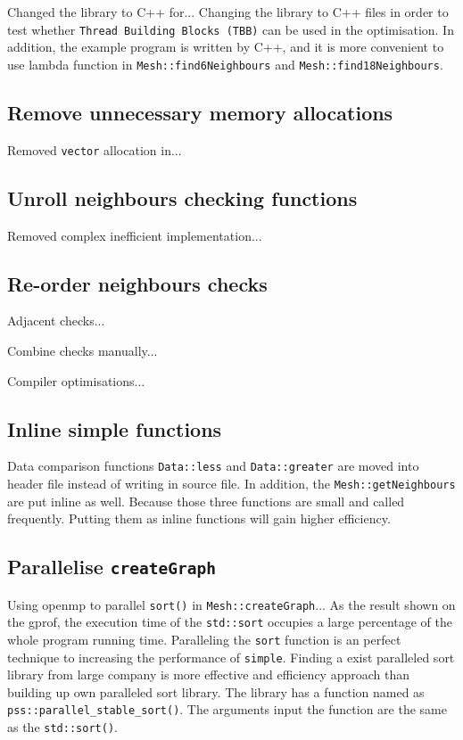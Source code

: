 \documentclass[conference]{IEEEtran}
\begin{document}
Changed the library to C++ for...
Changing the library to C++ files in order to test whether \texttt{Thread Building Blocks (TBB)} can be used in the optimisation. In addition, the example program is written by C++, and it is more convenient to use lambda function in \texttt{Mesh::find6Neighbours} and \texttt{Mesh::find18Neighbours}. 

\subsection{Remove unnecessary memory allocations}

Removed \texttt{vector} allocation in...

\subsection{Unroll neighbours checking functions}

Removed complex inefficient implementation...

\subsection{Re-order neighbours checks}

Adjacent checks...

Combine checks manually...

Compiler optimisations...

\subsection{Inline simple functions}

Data comparison functions \texttt{Data::less} and \texttt{Data::greater} are moved into header file instead of writing in source file. In addition, the \texttt{Mesh::getNeighbours} are put inline as well. Because those three functions are small and called frequently. Putting them as inline functions will gain higher efficiency. 

\subsection{Parallelise \texttt{createGraph}}

Using openmp to parallel \texttt{sort()} in \texttt{Mesh::createGraph}...
As the result shown on the gprof, the execution time of the \texttt{std::sort} occupies a large percentage of the whole program running time. Paralleling the \texttt{sort} function is an perfect technique to increasing the performance of \texttt{simple}. Finding a exist paralleled sort library from large company is more effective and efficiency approach than building up own paralleled sort library. \cite{parallelsort} The library has a function named as \texttt{pss::parallel\_stable\_sort()}. The arguments input the function are the same as the \texttt{std::sort()}. 
\end{document}
